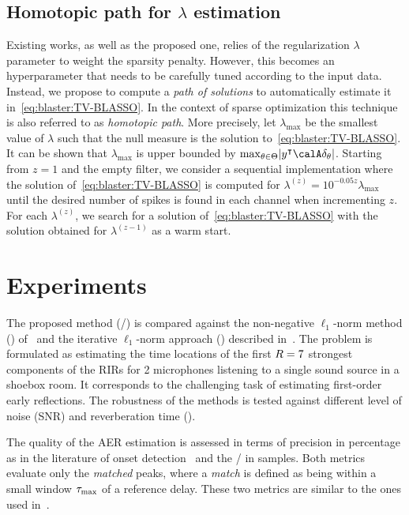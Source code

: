 \subsection{Homotopic path for $\lambda$ estimation}\label{sec:blaster:lambda}
Existing works, as well as the proposed one, relies of the regularization $\lambda$ parameter to weight the sparsity penalty.
However, this becomes an hyperparameter that needs to be carefully tuned according to the input data.
Instead, we propose to compute a \textit{path of solutions} to automatically estimate it in~\cref{eq:blaster:TV-BLASSO}.
In the context of sparse optimization this technique is also referred to as \textit{homotopic path}.
More precisely, let $\lambda_{\max}$ be the smallest value of $\lambda$ such that the null measure is the solution to~\cref{eq:blaster:TV-BLASSO}.
It can be shown that $\lambda_{\max}$ is upper bounded by $\max_{\theta\in\Theta} \kvbar{y^\intercal\opObs\delta_\theta}$.
Starting from $z=1$ and the empty filter, we consider a sequential implementation where the solution of~\cref{eq:blaster:TV-BLASSO} is computed for $\lambda^{(z)}= 10^{-0.05z}\lambda_{\max}$ until the desired number of spikes is found in each channel when incrementing $z$.
For each $\lambda^(z)$, we search for a solution of~\cref{eq:blaster:TV-BLASSO} with the solution obtained for $\lambda^{(z-1)}$ as a warm start.

\section{Experiments}\label{sec:blaster:exp}
The proposed method (\BLASTER/) is compared against the non-negative $\ell_1$-norm method (\algoBsn) of~ and the iterative $\ell_1$-norm approach (\algoCrocco) described in~.
The problem is formulated as estimating the time locations of the first $R=7$ strongest components of the RIRs for 2 microphones listening to a single sound source in a shoebox room. It corresponds to the challenging task of estimating first-order early reflections.
The robustness of the methods is tested against different level of noise (SNR) and reverberation time (\RT{}).

\mynewline
The quality of the AER estimation is assessed in terms of precision
in percentage as in the literature of onset detection~ and the \RMSEtxt/ in samples.
Both metrics evaluate only the \textit{matched} peaks, where a \textit{match} is defined as being within a small window $\tau_\text{max}$ of a reference delay.
These two metrics are similar to the ones used in~.

